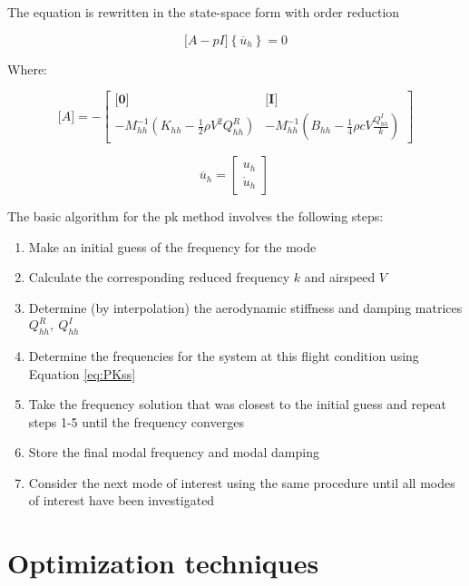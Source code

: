 The equation is rewritten in the state-space form with order reduction

\begin{equation}
    \label{eq:PKss}
\lbrack A - pI\rbrack\left\{ {\overline{u}}_{h} \right\} = 0
\end{equation}

Where:

\begin{equation}
\lbrack A\rbrack = - \begin{bmatrix}
\mathbf{\lbrack 0\rbrack} & \mathbf{\lbrack I\rbrack} \\
 - M_{hh}^{- 1}\left( K_{hh} - \frac{1}{2}\rho V^{2}Q_{hh}^{R} \right) & - M_{hh}^{- 1}\left( B_{hh} - \frac{1}{4}\rho cV\frac{Q_{hh}^{I}}{k} \right)
\end{bmatrix}
\end{equation}

\begin{equation}
  {\overline{u}}_{h} = \begin{bmatrix}
    u_{h} \\
    {\dot{u}}_{h}
    \end{bmatrix}\  
\end{equation}


The basic algorithm for the pk method involves the following steps:

\begin{enumerate}
\def\labelenumi{\arabic{enumi}.}
\item
  Make an initial guess of the frequency for the mode
\item
  Calculate the corresponding reduced frequency $k$ and airspeed $V$
\item
  Determine (by interpolation) the aerodynamic stiffness and damping
  matrices $Q_{hh}^{R},\ Q_{hh}^{I}$
\item
  Determine the frequencies for the system at this flight condition
  using Equation \eqref{eq:PKss}
\item
  Take the frequency solution that was closest to the initial guess and
  repeat steps 1-5 until the frequency converges
\item
  Store the final modal frequency and modal damping
\item
  Consider the next mode of interest using the same procedure until all
  modes of interest have been investigated
\end{enumerate}


\section{Optimization techniques }
\label{optimization-techniques}

